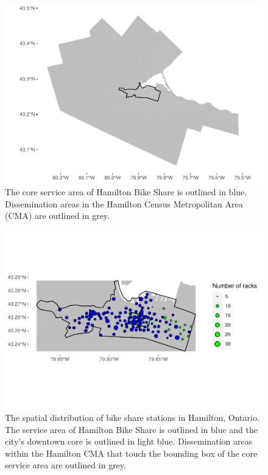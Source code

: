 \documentclass[]{elsarticle} %
\begin{document}
\begin{figure}

{\centering \includegraphics[width=0.65\linewidth]{Bike-share-spatial-equity_files/figure-latex/hamilton-and-sobi-service-area-1} 

}

\caption{The core service area of Hamilton Bike Share is outlined in blue. Dissemination areas in the Hamilton Census Metropolitan Area (CMA) are outlined in grey.}\label{fig:hamilton-and-sobi-service-area}
\end{figure}

\begin{figure}

{\centering \includegraphics[width=1\linewidth]{Bike-share-spatial-equity_files/figure-latex/sobi-stations-in-hamilton-1} 

}

\caption{The spatial distribution of bike share stations in Hamilton, Ontario. The service area of Hamilton Bike Share is outlined in blue and the city's downtown core is outlined in light blue. Dissemination areas within the Hamilton CMA that touch the bounding box of the core service area are outlined in grey.}\label{fig:sobi-stations-in-hamilton}
\end{figure}
\end{document}
